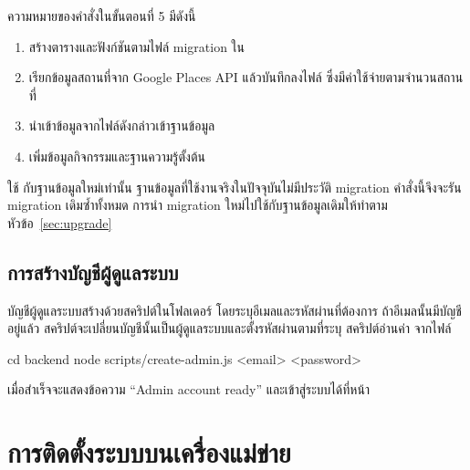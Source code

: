ความหมายของคำสั่งในขั้นตอนที่ 5 มีดังนี้

\begin{enumerate}
\item {} สร้างตารางและฟังก์ชันตามไฟล์ migration ใน 
\item {} เรียกข้อมูลสถานที่จาก Google Places API แล้วบันทึกลงไฟล์  ซึ่งมีค่าใช้จ่ายตามจำนวนสถานที่
\item {} นำเข้าข้อมูลจากไฟล์ดังกล่าวเข้าฐานข้อมูล
\item {} เพิ่มข้อมูลกิจกรรมและฐานความรู้ตั้งต้น
\end{enumerate}

\begin{warning}
ใช้  กับฐานข้อมูลใหม่เท่านั้น ฐานข้อมูลที่ใช้งานจริงในปัจจุบันไม่มีประวัติ migration คำสั่งนี้จึงจะรัน migration เดิมซ้ำทั้งหมด การนำ migration ใหม่ไปใช้กับฐานข้อมูลเดิมให้ทำตามหัวข้อ~\ref{sec:upgrade}
\end{warning}

\subsection{การสร้างบัญชีผู้ดูแลระบบ}
\label{sec:create-admin}

บัญชีผู้ดูแลระบบสร้างด้วยสคริปต์ในโฟลเดอร์  โดยระบุอีเมลและรหัสผ่านที่ต้องการ ถ้าอีเมลนั้นมีบัญชีอยู่แล้ว สคริปต์จะเปลี่ยนบัญชีนั้นเป็นผู้ดูแลระบบและตั้งรหัสผ่านตามที่ระบุ สคริปต์อ่านค่า  จากไฟล์ 

\begin{terminal}
cd backend
node scripts/create-admin.js <email> <password>
\end{terminal}

เมื่อสำเร็จจะแสดงข้อความ ``Admin account ready'' และเข้าสู่ระบบได้ที่หน้า 

\section{การติดตั้งระบบบนเครื่องแม่ข่าย}
\label{sec:install-steps}

